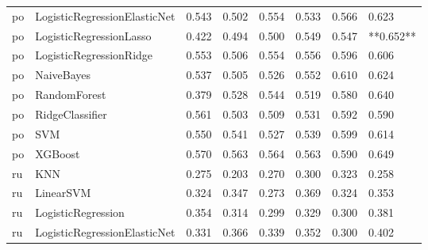 \begin{tabular}{llllllll}
      po & LogisticRegressionElasticNet & 0.543 &                     0.502 &                 0.554 &                  0.533 &                                   0.566 &     0.623 \\
      po &      LogisticRegressionLasso & 0.422 &                     0.494 &                 0.500 &                  0.549 &                                   0.547 & **0.652** \\
      po &      LogisticRegressionRidge & 0.553 &                     0.506 &                 0.554 &                  0.556 &                                   0.596 &     0.606 \\
      po &                   NaiveBayes & 0.537 &                     0.505 &                 0.526 &                  0.552 &                                   0.610 &     0.624 \\
      po &                 RandomForest & 0.379 &                     0.528 &                 0.544 &                  0.519 &                                   0.580 &     0.640 \\
      po &              RidgeClassifier & 0.561 &                     0.503 &                 0.509 &                  0.531 &                                   0.592 &     0.590 \\
      po &                          SVM & 0.550 &                     0.541 &                 0.527 &                  0.539 &                                   0.599 &     0.614 \\
      po &                      XGBoost & 0.570 &                     0.563 &                 0.564 &                  0.563 &                                   0.590 &     0.649 \\
      ru &                          KNN & 0.275 &                     0.203 &                 0.270 &                  0.300 &                                   0.323 &     0.258 \\
      ru &                    LinearSVM & 0.324 &                     0.347 &                 0.273 &                  0.369 &                                   0.324 &     0.353 \\
      ru &           LogisticRegression & 0.354 &                     0.314 &                 0.299 &                  0.329 &                                   0.300 &     0.381 \\
      ru & LogisticRegressionElasticNet & 0.331 &                     0.366 &                 0.339 &                  0.352 &                                   0.300 &     0.402 \\

\end{tabular}
